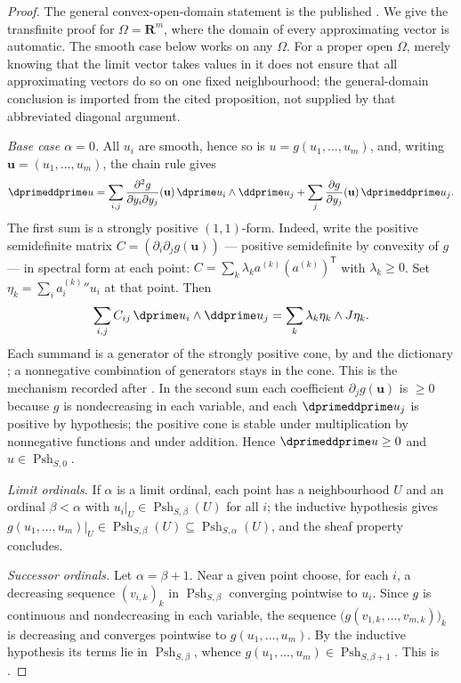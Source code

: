 \begin{proof}
The general convex-open-domain statement is the published
\cite[Proposition~8.2.1]{CLD25}.  We give the transfinite proof for
$\Omega=\mathbf R^m$, where the domain of every approximating vector is
automatic.  The smooth case below works on any $\Omega$.  For a proper
open $\Omega$, merely knowing that the limit vector takes values in it
does not ensure that all approximating vectors do so on one fixed
neighbourhood; the general-domain conclusion is imported from the cited
proposition, not supplied by that abbreviated diagonal argument.

\emph{Base case $\alpha=0$.}  All $u_i$ are smooth, hence so is
$u=g(u_1,\dots,u_m)$, and, writing $\mathbf u=(u_1,\ldots,u_m)$, the chain rule gives
\[
 \dprimeddprime u
 =\sum_{i,j}\frac{\partial^2g}{\partial y_i\partial y_j}(\mathbf u)\,
     \dprime u_i\wedge\ddprime u_j
 +\sum_j\frac{\partial g}{\partial y_j}(\mathbf u)\,\dprimeddprime u_j .
\]
The first sum is a strongly positive $(1,1)$-form.  Indeed, write the
positive semidefinite matrix $C=(\partial_i\partial_jg(\mathbf u))$ --- positive
semidefinite by convexity of $g$ --- in spectral form at each point:
$C=\sum_k\lambda_ka^{(k)}(a^{(k)})^{\mathsf T}$ with $\lambda_k\ge0$.
Set $\eta_k=\sum_i a_i^{(k)}\dprime u_i$ at that point.  Then
\[
 \sum_{i,j}C_{ij}\,\dprime u_i\wedge\ddprime u_j
 =\sum_k\lambda_k\eta_k\wedge J\eta_k.
\]
Each summand is a generator of the strongly positive cone, by
 and the dictionary
; a nonnegative combination of
generators stays in the cone.  This is the mechanism recorded after
.  In the second sum each coefficient
$\partial_jg(\mathbf u)$ is $\ge0$ because $g$ is nondecreasing in each variable, and
each $\dprimeddprime u_j$ is positive by hypothesis; the positive cone is
stable under multiplication by nonnegative functions and under addition.
Hence $\dprimeddprime u\ge0$ and $u\in\operatorname{Psh}_{S,0}$.

\emph{Limit ordinals.}  If $\alpha$ is a limit ordinal, each point has a
neighbourhood $U$ and an ordinal $\beta<\alpha$ with
$u_i|_U\in\operatorname{Psh}_{S,\beta}(U)$ for all $i$; the inductive
hypothesis gives $g(u_1,\dots,u_m)|_U\in\operatorname{Psh}_{S,\beta}(U)
\subseteq\operatorname{Psh}_{S,\alpha}(U)$, and the sheaf property concludes.

\emph{Successor ordinals.}  Let $\alpha=\beta+1$.  Near a given point choose,
for each $i$, a decreasing sequence $(v_{i,k})_k$ in
$\operatorname{Psh}_{S,\beta}$ converging pointwise to $u_i$.  Since $g$ is
continuous and nondecreasing in each variable, the sequence
$\bigl(g(v_{1,k},\dots,v_{m,k})\bigr)_k$ is decreasing and converges
pointwise to $g(u_1,\dots,u_m)$.  By the inductive hypothesis its terms lie
in $\operatorname{Psh}_{S,\beta}$, whence
$g(u_1,\dots,u_m)\in\operatorname{Psh}_{S,\beta+1}$.  This is
\cite[Proposition~8.2.1]{CLD25}.
\end{proof}

